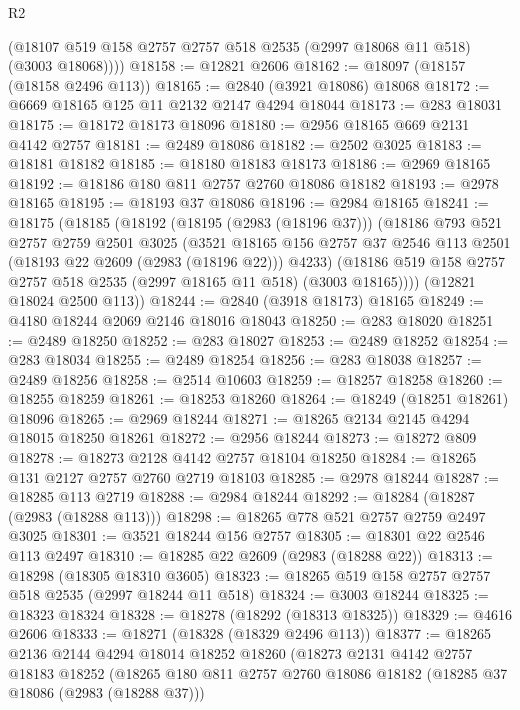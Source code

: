 \begin{lexlean}{R2}
\begin{coremodule}
        (@18107 @519 @158 @2757 @2757 @518 @2535 (@2997 @18068 @11 @518) (@3003 @18068))))
@18158 := @12821 @2606
@18162 := @18097 (@18157 (@18158 @2496 @113))
@18165 := @2840 (@3921 @18086) @18068
@18172 := @6669 @18165 @125 @11 @2132 @2147 @4294 @18044
@18173 := @283 @18031
@18175 := @18172 @18173 @18096
@18180 := @2956 @18165 @669 @2131 @4142 @2757
@18181 := @2489 @18086
@18182 := @2502 @3025
@18183 := @18181 @18182
@18185 := @18180 @18183 @18173
@18186 := @2969 @18165
@18192 := @18186 @180 @811 @2757 @2760 @18086 @18182
@18193 := @2978 @18165
@18195 := @18193 @37 @18086
@18196 := @2984 @18165
@18241 := @18175
    (@18185
      (@18192
        (@18195 (@2983 (@18196 @37)))
        (@18186
          @793
          @521
          @2757
          @2759
          @2501
          @3025
          (@3521
            @18165
            @156
            @2757
            @37
            @2546
            @113
            @2501
            (@18193 @22 @2609 (@2983 (@18196 @22)))
            @4233)
          (@18186 @519 @158 @2757 @2757 @518 @2535 (@2997 @18165 @11 @518) (@3003 @18165))))
      (@12821 @18024 @2500 @113))
@18244 := @2840 (@3918 @18173) @18165
@18249 := @4180 @18244 @2069 @2146 @18016 @18043
@18250 := @283 @18020
@18251 := @2489 @18250
@18252 := @283 @18027
@18253 := @2489 @18252
@18254 := @283 @18034
@18255 := @2489 @18254
@18256 := @283 @18038
@18257 := @2489 @18256
@18258 := @2514 @10603
@18259 := @18257 @18258
@18260 := @18255 @18259
@18261 := @18253 @18260
@18264 := @18249 (@18251 @18261) @18096
@18265 := @2969 @18244
@18271 := @18265 @2134 @2145 @4294 @18015 @18250 @18261
@18272 := @2956 @18244
@18273 := @18272 @809
@18278 := @18273 @2128 @4142 @2757 @18104 @18250
@18284 := @18265 @131 @2127 @2757 @2760 @2719 @18103
@18285 := @2978 @18244
@18287 := @18285 @113 @2719
@18288 := @2984 @18244
@18292 := @18284 (@18287 (@2983 (@18288 @113)))
@18298 := @18265 @778 @521 @2757 @2759 @2497 @3025
@18301 := @3521 @18244 @156 @2757
@18305 := @18301 @22 @2546 @113 @2497
@18310 := @18285 @22 @2609 (@2983 (@18288 @22))
@18313 := @18298 (@18305 @18310 @3605)
@18323 := @18265 @519 @158 @2757 @2757 @518 @2535 (@2997 @18244 @11 @518)
@18324 := @3003 @18244
@18325 := @18323 @18324
@18328 := @18278 (@18292 (@18313 @18325))
@18329 := @4616 @2606
@18333 := @18271 (@18328 (@18329 @2496 @113))
@18377 := @18265
    @2136
    @2144
    @4294
    @18014
    @18252
    @18260
    (@18273
      @2131
      @4142
      @2757
      @18183
      @18252
      (@18265
        @180
        @811
        @2757
        @2760
        @18086
        @18182
        (@18285 @37 @18086 (@2983 (@18288 @37)))

\end{coremodule}
\end{lexlean}

